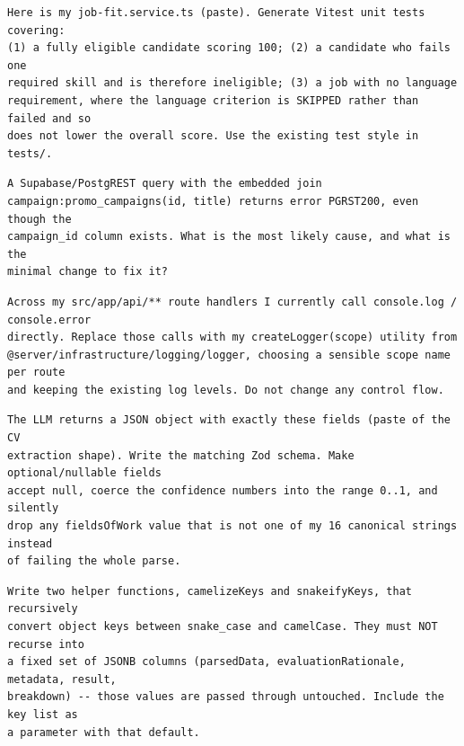 \begin{lstlisting}[caption={Generating unit tests for code the author wrote.},label={lst:dev-tests}]
Here is my job-fit.service.ts (paste). Generate Vitest unit tests covering:
(1) a fully eligible candidate scoring 100; (2) a candidate who fails one
required skill and is therefore ineligible; (3) a job with no language
requirement, where the language criterion is SKIPPED rather than failed and so
does not lower the overall score. Use the existing test style in tests/.
\end{lstlisting}

\begin{lstlisting}[caption={Targeted debugging of a framework-specific error.},label={lst:dev-debug}]
A Supabase/PostgREST query with the embedded join
campaign:promo_campaigns(id, title) returns error PGRST200, even though the
campaign_id column exists. What is the most likely cause, and what is the
minimal change to fix it?
\end{lstlisting}

\begin{lstlisting}[caption={Refactoring scattered logging behind a single utility.},label={lst:dev-logging}]
Across my src/app/api/** route handlers I currently call console.log / console.error
directly. Replace those calls with my createLogger(scope) utility from
@server/infrastructure/logging/logger, choosing a sensible scope name per route
and keeping the existing log levels. Do not change any control flow.
\end{lstlisting}

\begin{lstlisting}[caption={Writing a Zod schema from a fixed JSON contract.},label={lst:dev-zod}]
The LLM returns a JSON object with exactly these fields (paste of the CV
extraction shape). Write the matching Zod schema. Make optional/nullable fields
accept null, coerce the confidence numbers into the range 0..1, and silently
drop any fieldsOfWork value that is not one of my 16 canonical strings instead
of failing the whole parse.
\end{lstlisting}

\begin{lstlisting}[caption={Converting database rows to and from API casing.},label={lst:dev-casing}]
Write two helper functions, camelizeKeys and snakeifyKeys, that recursively
convert object keys between snake_case and camelCase. They must NOT recurse into
a fixed set of JSONB columns (parsedData, evaluationRationale, metadata, result,
breakdown) -- those values are passed through untouched. Include the key list as
a parameter with that default.
\end{lstlisting}

